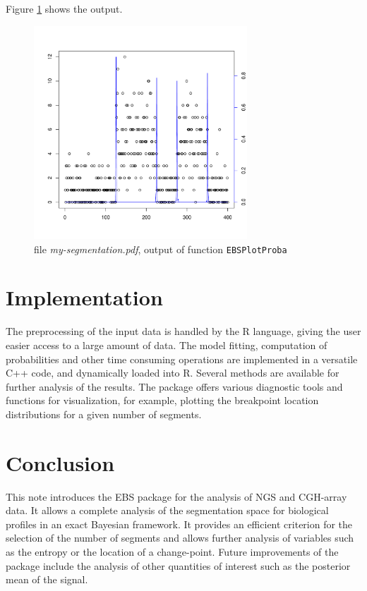 \documentclass{bioinfo}
\begin{document}
\begin{methods}
Figure \ref{fig:01} shows the output. 

\begin{figure}[!h]%
\centerline{\includegraphics[width=8cm]{my-segmentation.pdf}}
\caption{file \textit{my-segmentation.pdf}, output of function \texttt{EBSPlotProba}}\label{fig:01}
\end{figure}

\end{methods}



\section{Implementation}

The preprocessing of the input data is handled by the R language,
giving the user easier access to a large amount of data. The model fitting, computation of probabilities 
and other time consuming operations are implemented in a versatile C++ code, and dynamically loaded into R.
Several methods are available for further analysis of the results. The package
offers various diagnostic tools and functions for visualization, for
example, plotting the breakpoint location distributions for a given number of segments.




\section{Conclusion}

This note introduces the EBS package for the analysis of NGS and CGH-array data. It allows a complete analysis of the segmentation space for biological profiles in an exact Bayesian framework. 
It provides an efficient criterion for the selection of the number of segments and allows further analysis of variables such as the entropy or the location of a change-point. 
Future improvements of the package include the analysis of other quantities of interest such as the posterior mean of the signal.
\end{document}
